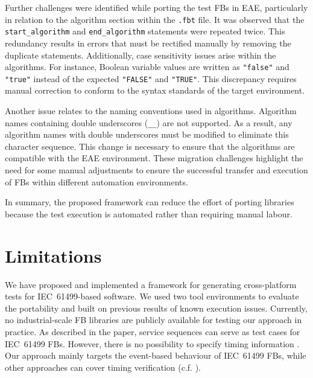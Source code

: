 \begin{bibunit}
Further challenges were identified while porting the test FBs in EAE, particularly in relation to the algorithm section within the \texttt{.fbt} file. It was observed that the \texttt{start\_algorithm} and \texttt{end\_algorithm} statements were repeated twice. This redundancy results in errors that must be rectified manually by removing the duplicate statements. Additionally, case sensitivity issues arise within the algorithms. For instance, Boolean variable values are written as \texttt{"false"} and \texttt{"true"} instead of the expected \texttt{"FALSE"} and \texttt{"TRUE"}. This discrepancy requires manual correction to conform to the syntax standards of the target environment.

Another issue relates to the naming conventions used in algorithms. Algorithm names containing double underscores (\texttt{\_\_}) are not supported. As a result, any algorithm names with double underscores must be modified to eliminate this character sequence. This change is necessary to ensure that the algorithms are compatible with the EAE environment. These migration challenges highlight the need for some manual adjustments to ensure the successful transfer and execution of FBs within different automation environments.

In summary, the proposed framework can reduce the effort of porting libraries because the test execution is automated rather than requiring manual labour.

\section{Limitations}
\label{sec::limitations}
We have proposed and implemented a framework for generating cross-platform tests for IEC~61499-based software. We used two tool environments to evaluate the portability and built on previous results of known execution issues. Currently, no industrial-scale FB libraries are publicly available for testing our approach in practice. As described in the paper, service sequences can serve as test cases for IEC~61499 FBs. However, there is no possibility to specify timing information \cite{Wiesmayr_ifac}. Our approach mainly targets the event-based behaviour of IEC~61499 FBs, while other approaches can cover timing verification (c.f. \cite{Bruns.2023}).


\end{bibunit}

